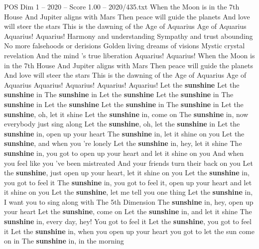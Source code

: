 \begin{textsample}{POS Dim 1 – 2020 – Score 1.00 – 2020/435.txt}  \label{ex:f1_pos_016}
When the Moon is in the 7th House And Jupiter aligns with Mars Then peace will guide the planets And love will steer the stars This is the dawning of the Age of Aquarius Age of Aquarius Aquarius!
Aquarius!
Harmony and understanding Sympathy and trust abounding No more falsehoods or derisions Golden living dreams of visions Mystic crystal revelation And the mind 's true liberation Aquarius!
Aquarius!
When the Moon is in the 7th House And Jupiter aligns with Mars Then peace will guide the planets And love will steer the stars This is the dawning of the Age of Aquarius Age of Aquarius Aquarius!
Aquarius!
Aquarius!
Aquarius!
Let the \textbf{sunshine} Let the \textbf{sunshine} in The \textbf{sunshine} in Let the \textbf{sunshine} Let the \textbf{sunshine} in The \textbf{sunshine} in Let the \textbf{sunshine} Let the \textbf{sunshine} in The \textbf{sunshine} in Let the \textbf{sunshine}, oh, let it shine Let the \textbf{sunshine} in, come on The \textbf{sunshine} in, now everybody just sing along Let the \textbf{sunshine}, oh, let the \textbf{sunshine} in Let the \textbf{sunshine} in, open up your heart The \textbf{sunshine} in, let it shine on you Let the \textbf{sunshine}, and when you 're lonely Let the \textbf{sunshine} in, hey, let it shine The \textbf{sunshine} in, you got to open up your heart and let it shine on you And when you feel like you 've been mistreated And your friends turn their back on you Let the \textbf{sunshine}, just open up your heart, let it shine on you Let the \textbf{sunshine} in, you got to feel it The \textbf{sunshine} in, you got to feel it, open up your heart and let it shine on you Let the \textbf{sunshine}, let me tell you one thing Let the \textbf{sunshine} in, I want you to sing along with The 5th Dimension The \textbf{sunshine} in, hey, open up your heart Let the \textbf{sunshine}, come on Let the \textbf{sunshine} in, and let it shine The \textbf{sunshine} in, every day, hey!
You got to feel it Let the \textbf{sunshine}, you got to feel it Let the \textbf{sunshine} in, when you open up your heart you got to let the sun come on in The \textbf{sunshine} in, in the morning

\end{textsample}
